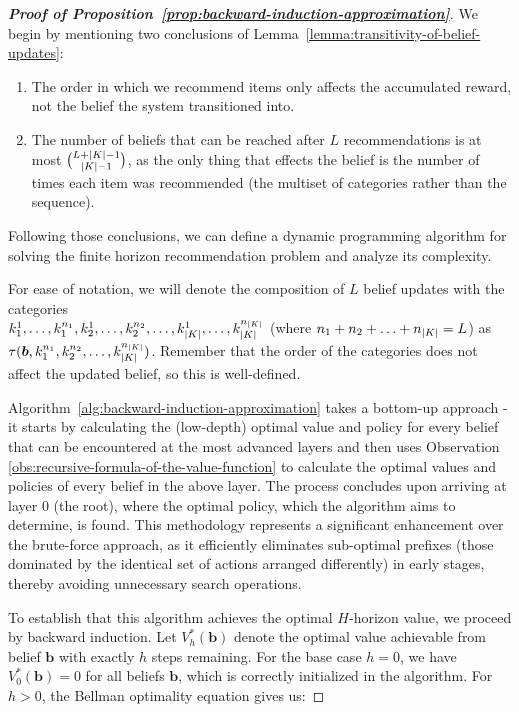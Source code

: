 \begin{proof}[\normalfont\bfseries Proof of Proposition~\ref{prop:backward-induction-approximation}]
  We begin by mentioning two conclusions of Lemma~\ref{lemma:transitivity-of-belief-updates}:
  \begin{enumerate}
    \item The order in which we recommend items only affects the accumulated reward, not the belief the system transitioned into.
    \item The number of beliefs that can be reached after $L$ recommendations is at most ${ L + \lvert K\rvert - 1 \choose \lvert K\rvert - 1}$, as the only thing that effects the belief is the number of times each item was recommended (the multiset of categories rather than the sequence).
  \end{enumerate}

  Following those conclusions, we can define a dynamic programming algorithm for solving the finite horizon recommendation problem and analyze its complexity.
  
  For ease of notation, we will denote the composition of $L$ belief updates with the categories \\
  $k_1^1, \ldots, k_1^{n_1}, k_2^1, \ldots, k_2^{n_2}, \ldots, k_{\lvert K\rvert}^1, \ldots, k_{\lvert K\rvert}^{n_{\lvert K\rvert}}$ (where $n_1 + n_2 + \ldots + n_{\lvert K\rvert} = L$) as $\tau(\bm{b}, k_1^{n_1}, k_2^{n_2}, \ldots, k_{\lvert K\rvert}^{n_{\lvert K\rvert}})$. Remember that the order of the categories does not affect the updated belief, so this is well-defined.

  Algorithm~\ref{alg:backward-induction-approximation} takes a bottom-up approach - it starts by calculating the (low-depth) optimal value and policy for every belief that can be encountered at the most advanced layers and then uses Observation \ref{obs:recursive-formula-of-the-value-function} to calculate the optimal values and policies of every belief in the above layer. The process concludes upon arriving at layer $0$ (the root), where the optimal policy, which the algorithm aims to determine, is found. This methodology represents a significant enhancement over the brute-force approach, as it efficiently eliminates sub-optimal prefixes (those dominated by the identical set of actions arranged differently) in early stages, thereby avoiding unnecessary search operations.

  To establish that this algorithm achieves the optimal $H$-horizon value, we proceed by backward induction. Let $V^*_h(\bm{b})$ denote the optimal value achievable from belief $\bm{b}$ with exactly $h$ steps remaining. For the base case $h=0$, we have $V^*_0(\bm{b}) = 0$ for all beliefs $\bm{b}$, which is correctly initialized in the algorithm. For $h > 0$, the Bellman optimality equation gives us:
  

\end{proof}
